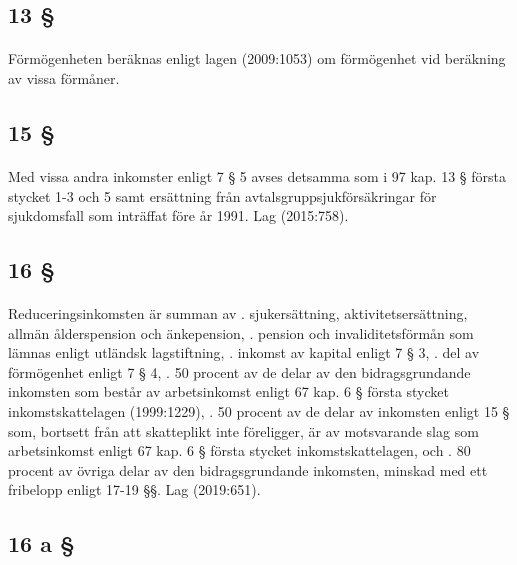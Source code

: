 \documentclass[a4paper,notitlepage,openany,10pt]{book}
\begin{document}
\subsection*{13 §}
\paragraph*{}
Förmögenheten beräknas enligt lagen (2009:1053) om förmögenhet vid beräkning av vissa förmåner.
\subsection*{15 §}
\paragraph*{}
Med vissa andra inkomster enligt 7 § 5 avses detsamma som i 97 kap. 13 § första stycket 1-3 och 5 samt ersättning från avtalsgruppsjukförsäkringar för sjukdomsfall som inträffat före år 1991.
Lag (2015:758).
\subsection*{16 §}
\paragraph*{}
Reduceringsinkomsten är summan av
. sjukersättning, aktivitetsersättning, allmän ålderspension och änkepension,
. pension och invaliditetsförmån som lämnas enligt utländsk lagstiftning,
. inkomst av kapital enligt 7 § 3,
. del av förmögenhet enligt 7 § 4,
. 50 procent av de delar av den bidragsgrundande inkomsten som består av arbetsinkomst enligt 67 kap. 6 § första stycket inkomstskattelagen (1999:1229),
. 50 procent av de delar av inkomsten enligt 15 § som, bortsett från att skatteplikt inte föreligger, är av motsvarande slag som arbetsinkomst enligt 67 kap. 6 § första stycket inkomstskattelagen, och
. 80 procent av övriga delar av den bidragsgrundande inkomsten, minskad med ett fribelopp enligt 17-19 §§.
Lag (2019:651).
\subsection*{16 a §}
\end{document}

